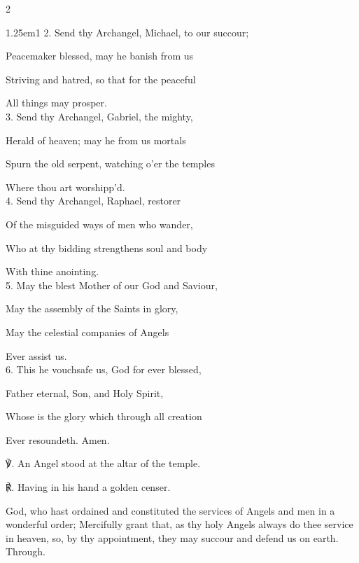 \begin{paracol}{2}
\begin{hangparas}{1.25em}{1}
2. Send thy Archangel, Michael, to our succour;

Peacemaker blessed, may he banish from us

Striving and hatred, so that for the peaceful

All things may prosper.\\

3. Send thy Archangel, Gabriel, the mighty,

Herald of heaven; may he from us mortals

Spurn the old serpent, watching o’er the temples

Where thou art worshipp'd.\\

4. Send thy Archangel, Raphael, restorer

Of the misguided ways of men who wander,

Who at thy bidding strengthens soul and body

With thine anointing.\\

5. May the blest Mother of our God and Saviour,

May the assembly of the Saints in glory,

May the celestial companies of Angels

Ever assist us.\\

6. This he vouchsafe us, God for ever blessed,

Father eternal, Son, and Holy Spirit,

Whose is the glory which through all creation

Ever resoundeth. Amen.\\
\end{hangparas}

℣. An Angel stood at the altar of the temple.

℟. Having in his hand a golden censer.


\fussy	
\end{paracol}


\collect
{} God, who hast ordained and constituted the services of Angels and men in a wonderful order; Mercifully grant that, as thy holy Angels always do thee service in heaven, so, by thy appointment, they may succour and defend us on earth. Through.



